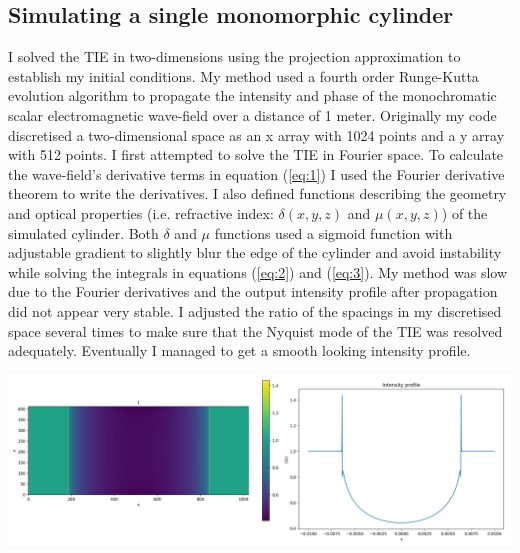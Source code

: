 \documentclass[9pt, a4paper]{article}
\newenvironment{Figure}
    {\par\medskip\noindent\minipage{\linewidth}}
    {\endminipage\par\medskip}
\begin{document}
\subsection{Simulating a single monomorphic cylinder}
I solved the TIE in two-dimensions using the projection approximation to establish my initial conditions. My method used a fourth order Runge-Kutta evolution algorithm to propagate the intensity and phase of the monochromatic scalar electromagnetic wave-field over a distance of 1 meter. Originally my code discretised a two-dimensional space as an x array with 1024 points and a y array with 512 points. I first attempted to solve the TIE in Fourier space. To calculate the wave-field's derivative terms in equation (\ref{eq:1}) I used the Fourier derivative theorem to write the derivatives. I also defined functions describing the geometry and optical properties (i.e. refractive index: $\delta(x, y, z)$ and $\mu(x, y, z)$) of the simulated cylinder. Both $\delta$ and $\mu$ functions used a sigmoid function with adjustable gradient to slightly blur the edge of the cylinder and avoid instability while solving the integrals in equations (\ref{eq:2}) and (\ref{eq:3}). My method was slow due to the Fourier derivatives and the output intensity profile after propagation did not appear very stable. I adjusted the ratio of the spacings in my discretised space several times to make sure that the Nyquist mode of the TIE was resolved adequately. Eventually I managed to get a smooth looking intensity profile.
\begin{Figure}
\centering
\includegraphics[width=\linewidth]{Fourier_intensity_profile.pdf}
\end{Figure}
\end{document}
